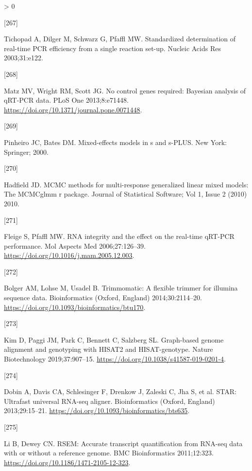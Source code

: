 \documentclass[twoside,10pt]{gihclass} %
\newlength{\cslhangindent}
\newlength{\csllabelwidth}
\newenvironment{CSLReferences}[3] %
 {%
  \setlength{\parindent}{0pt}
  \ifodd #1 \everypar{\setlength{\hangindent}{\cslhangindent}}\ignorespaces\fi
  \ifnum #2 > 0
  \setlength{\parskip}{#2\baselineskip}
  \fi
 }%
 {}
\newcommand{\CSLLeftMargin}[1]{\parbox[t]{\maxof{\widthof{#1}}{\csllabelwidth}}{#1}}
\newcommand{\CSLRightInline}[1]{\parbox[t]{\linewidth}{#1}}
\begin{document}
\begin{CSLReferences}{0}{0}
\leavevmode\hypertarget{ref-RN1934}{}%
\CSLLeftMargin{{[}267{]} }
\CSLRightInline{Tichopad A, Dilger M, Schwarz G, Pfaffl MW. Standardized determination of real-time PCR efficiency from a single reaction set-up. Nucleic Acids Res 2003;31:e122.}

\leavevmode\hypertarget{ref-RN1964}{}%
\CSLLeftMargin{{[}268{]} }
\CSLRightInline{Matz MV, Wright RM, Scott JG. No control genes required: Bayesian analysis of qRT-PCR data. PLoS One 2013;8:e71448. \url{https://doi.org/10.1371/journal.pone.0071448}.}

\leavevmode\hypertarget{ref-RN1986}{}%
\CSLLeftMargin{{[}269{]} }
\CSLRightInline{Pinheiro JC, Bates DM. Mixed-effects models in s and s-PLUS. New York: Springer; 2000.}

\leavevmode\hypertarget{ref-RN1992}{}%
\CSLLeftMargin{{[}270{]} }
\CSLRightInline{Hadfield JD. MCMC methods for multi-response generalized linear mixed models: The MCMCglmm r package. Journal of Statistical Software; Vol 1, Issue 2 (2010) 2010.}

\leavevmode\hypertarget{ref-RN2248}{}%
\CSLLeftMargin{{[}271{]} }
\CSLRightInline{Fleige S, Pfaffl MW. RNA integrity and the effect on the real-time qRT-PCR performance. Mol Aspects Med 2006;27:126--39. \url{https://doi.org/10.1016/j.mam.2005.12.003}.}

\leavevmode\hypertarget{ref-RN2382}{}%
\CSLLeftMargin{{[}272{]} }
\CSLRightInline{Bolger AM, Lohse M, Usadel B. Trimmomatic: A flexible trimmer for illumina sequence data. Bioinformatics (Oxford, England) 2014;30:2114--20. \url{https://doi.org/10.1093/bioinformatics/btu170}.}

\leavevmode\hypertarget{ref-RN2385}{}%
\CSLLeftMargin{{[}273{]} }
\CSLRightInline{Kim D, Paggi JM, Park C, Bennett C, Salzberg SL. Graph-based genome alignment and genotyping with HISAT2 and HISAT-genotype. Nature Biotechnology 2019;37:907--15. \url{https://doi.org/10.1038/s41587-019-0201-4}.}

\leavevmode\hypertarget{ref-RN2386}{}%
\CSLLeftMargin{{[}274{]} }
\CSLRightInline{Dobin A, Davis CA, Schlesinger F, Drenkow J, Zaleski C, Jha S, et al. STAR: Ultrafast universal RNA-seq aligner. Bioinformatics (Oxford, England) 2013;29:15--21. \url{https://doi.org/10.1093/bioinformatics/bts635}.}

\leavevmode\hypertarget{ref-RN2387}{}%
\CSLLeftMargin{{[}275{]} }
\CSLRightInline{Li B, Dewey CN. RSEM: Accurate transcript quantification from RNA-seq data with or without a reference genome. BMC Bioinformatics 2011;12:323. \url{https://doi.org/10.1186/1471-2105-12-323}.}


\end{CSLReferences}
\end{document}
